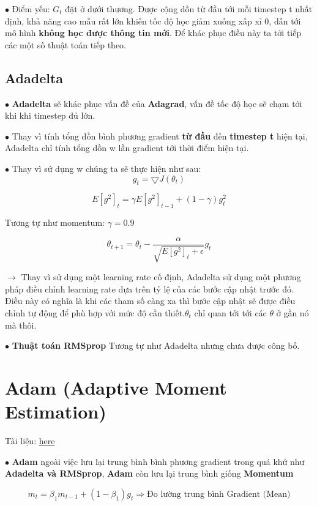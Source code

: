 \documentclass[final,letterpaper,twoside,12pt]{report}
\begin{document}
$\bullet$ Điểm yếu: $G_t$ đặt ở dưới thương. Được cộng dồn từ đầu tới mỗi timestep t nhất định, khả năng cao mẫu rất lớn khiến tốc độ học giảm xuống xấp xỉ 0, dẫn tới mô hình \textbf{\color{red}không học được thông tin mới}. Để khác phục điều này ta tới tiếp các một số thuật toán tiếp theo.

\subsection{Adadelta}

$\bullet$ \textbf{\color{red}Adadelta} sẽ khác phục vấn đề của \textbf{\color{red}Adagrad}, vấn đề tốc độ học sẽ chạm tới khi khi timestep đủ lớn.

$\bullet$ Thay vì tính tổng dồn bình phương gradient \textbf{từ đầu} đến \textbf{timestep t } hiện tại, Adadelta chỉ tính tổng dồn w lần gradient tới thời điểm hiện tại.

$\bullet$ Thay vì sử dụng w chúng ta sẽ thực hiện như sau:
$$g_t = \bigtriangledown J(\theta_t)$$

$$E[g^2]_t = \gamma E[g^2]_{t-1} + (1 - \gamma)g^2_t $$

Tương tự như momentum: $\gamma = 0.9$

$$\theta_{t+1} = \theta_t - \dfrac{\alpha}{\sqrt{E[g^2]_t + \epsilon}}g_t$$

$\longrightarrow$ Thay vì sử dụng một learning rate cố định, Adadelta sử dụng một phương pháp điều chỉnh learning rate dựa trên tỷ lệ của các bước cập nhật trước đó. Điều này có nghĩa là khi các tham số càng xa thì bước cập nhật sẽ được điều chỉnh tự động để phù hợp với mức độ cần thiết.$\theta_t$ chỉ quan tới tới các $\theta$ ở gần nó mà thôi.


$\bullet$ \textbf{Thuật toán RMSprop} Tương tự như Adadelta nhưng chưa được công bố.

\section{Adam (Adaptive Moment Estimation)}

Tài liệu: \href{https://d2l.aivivn.com/chapter_optimization/adam_vn.html#lap-trinh}{here}

$\bullet$ \textbf{\color{red}Adam} ngoài việc lưu lại trung bình bình phương gradient trong quá khứ như \textbf{\color{red}Adadelta và RMSprop}, \textbf{\color{red}Adam} còn lưu lại trung bình giống \textbf{\color{red}Momentum}

$$m_t = \beta_1 m_{t-1} + (1 - \beta_1)g_t \Longrightarrow \text{Đo lường trung bình Gradient (Mean)}$$
\end{document}
